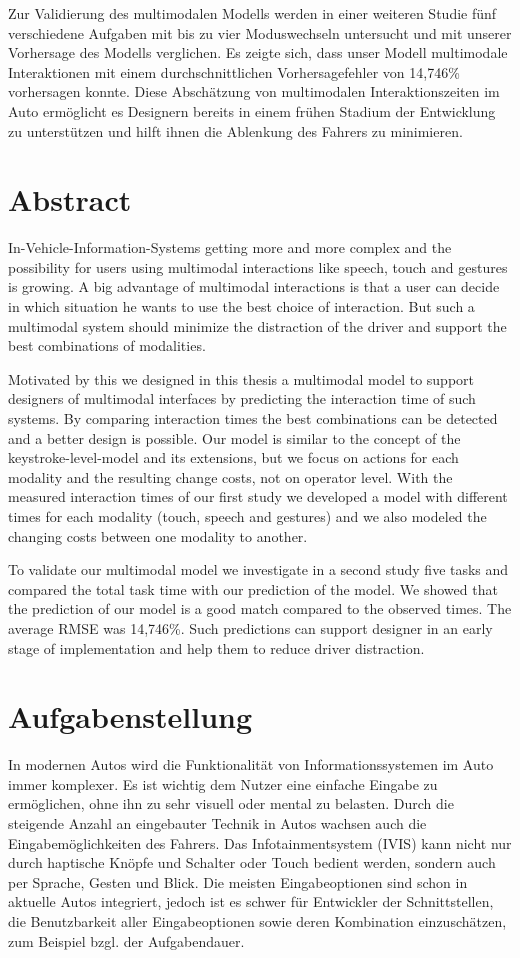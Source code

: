 \documentclass[11pt,a4paper,twoside]{book}
\begin{document}
Zur Validierung des multimodalen Modells werden in einer weiteren Studie fünf verschiedene Aufgaben mit bis zu vier Moduswechseln untersucht und mit unserer Vorhersage des Modells verglichen. Es zeigte sich, dass unser Modell multimodale Interaktionen mit einem durchschnittlichen Vorhersagefehler von 14,746\% vorhersagen konnte.  Diese Abschätzung von multimodalen Interaktionszeiten im Auto ermöglicht es Designern bereits in einem frühen Stadium der Entwicklung zu unterstützen und hilft ihnen die Ablenkung des Fahrers zu minimieren.



\chapter*{Abstract}
In-Vehicle-Information-Systems getting more and more complex and the possibility for users using multimodal interactions like speech, touch and gestures is growing. A big advantage of multimodal interactions is that a user can decide in which situation he wants to use the best choice of interaction. But such a multimodal system should minimize the distraction of the driver and support the best combinations of modalities.

Motivated by this we designed in this thesis a multimodal model to support designers of multimodal interfaces by predicting the interaction time of such systems. By comparing interaction times the best combinations can be detected and a better design is possible.
Our model is similar to the concept of the keystroke-level-model and its extensions, but we focus on actions for each modality and the resulting change costs, not on operator level. With the measured interaction times of our first study we developed a model with different times for each modality (touch, speech and gestures) and we also modeled the changing costs between one modality to another.

To validate our multimodal model we investigate in a second study five tasks and compared the total task time with our prediction of the model. We showed that the prediction of our model is a good match compared to the observed times. The average RMSE was 14,746\%. Such predictions can support designer in an early stage of implementation and help them to reduce driver distraction.

\clearpage
\chapter*{Aufgabenstellung}
In modernen Autos wird die Funktionalität von Informationssystemen im Auto immer komplexer. Es ist wichtig dem Nutzer eine einfache Eingabe zu ermöglichen, ohne ihn zu sehr visuell oder mental zu belasten. Durch die steigende Anzahl an eingebauter Technik in Autos wachsen auch die Eingabemöglichkeiten des Fahrers. Das Infotainmentsystem (IVIS) kann nicht nur durch haptische Knöpfe und Schalter oder Touch bedient werden, sondern auch per Sprache, Gesten und Blick. Die meisten Eingabeoptionen sind schon in aktuelle Autos integriert, jedoch ist es schwer für Entwickler der Schnittstellen, die Benutzbarkeit aller Eingabeoptionen sowie deren Kombination einzuschätzen, zum Beispiel bzgl. der Aufgabendauer.
\end{document}
